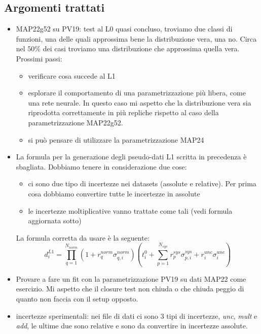 \documentclass{article}
\begin{document}
\subsection{Argomenti trattati}
\begin{itemize}
    \item MAP22g52 su PV19: test al L0 quasi concluso, troviamo due classi di funzioni, una delle quali approssima bene la distribuzione vera, una no. Circa nel $50 \%$ dei casi troviamo una distribuzione che approssima quella vera. 
    Prossimi passi:
    \begin{itemize}
        \item verificare cosa succede al L1
        \item esplorare il comportamento di una parametrizzazione più libera, come una rete neurale. In questo caso mi aspetto che la distribuzione vera sia riprodotta correttamente in più repliche rispetto al caso della parametrizzazione MAP22g52.
        \item si può pensare di utilizzare la parametrizzazione MAP24
    \end{itemize}

    \item La formula per la generazione degli pseudo-dati L1 scritta in precedenza è sbagliata. Dobbiamo tenere in considerazione due cose: 
    \begin{itemize}
        \item ci sono due tipo di incertezze nei datasets (assolute e relative). Per prima cosa dobbiamo convertire tutte le incertezze in assolute 
        \item le incertezze moltiplicative vanno trattate come tali (vedi formula aggiornata sotto)
    \end{itemize}
    La formula corretta da usare è la seguente:
    \[
    d_i^{L1} = \prod_{q=1}^{N_{norm}}(1+ r_q^{norm}\sigma_{q,i}^{norm})(t_i^0 + \sum_{p=1}^{N_{sys}} r_p^{sys}\sigma_{p,i}^{sys} + r_i^{unc} \sigma_i^{unc} )
    \]
    \item Provare a fare un fit con la parametrizzazione PV19 su dati MAP22 come esercizio. Mi aspetto che il closure test non chiuda o che chiuda peggio di quanto non faccia con il setup opposto.
    \item incertezze sperimentali: nei file di dati ci sono 3 tipi di incertezze, \textit{unc}, \textit{mult} e \textit{add}, le ultime due sono relative e sono da convertire in incertezze assolute.

    
\end{itemize}
\end{document}
